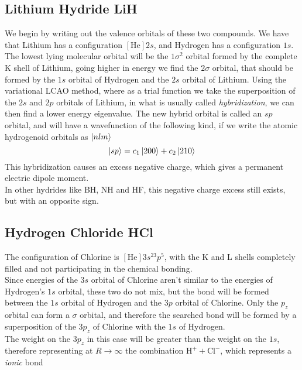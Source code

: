 \documentclass[../qm.tex]{subfiles}
\begin{document}
	\subsection{Lithium Hydride LiH}
	We begin by writing out the valence orbitals of these two compounds. We have that Lithium has a configuration $[\mathrm{He}]2s$, and Hydrogen has a configuration $1s$. The lowest lying molecular orbital will be the $1\sigma^2$ orbital formed by the complete K shell of Lithium, going higher in energy we find the $2\sigma$ orbital, that should be formed by the $1s$ orbital of Hydrogen and the $2s$ orbital of Lithium. Using the variational LCAO method, where as a trial function we take the superposition of the $2s$ and $2p$ orbitals of Lithium, in what is usually called \textit{hybridization}, we can then find a lower energy eigenvalue. The new hybrid orbital is called an $sp$ orbital, and will have a wavefunction of the following kind, if we write the atomic hydrogenoid orbitals as $\ket{nlm}$
	\begin{equation}
		\ket{sp}=c_1\ket{200}+c_2\ket{210}
		\label{eq:sporbital}
	\end{equation}
	This hybridization causes an excess negative charge, which gives a permanent electric dipole moment.\\
	In other hydrides like BH, NH and HF, this negative charge excess still exists, but with an opposite sign.
	\subsection{Hydrogen Chloride HCl}
	The configuration of Chlorine is $[\mathrm{He}]3s^23p^5$, with the K and L shells completely filled and not participating in the chemical bonding.\\
	Since energies of the $3s$ orbital of Chlorine aren't similar to the energies of Hydrogen's $1s$ orbital, these two do not mix, but the bond will be formed between the $1s$ orbital of Hydrogen and the $3p$ orbital of Chlorine. Only the $p_z$ orbital can form a $\sigma$ orbital, and therefore the searched bond will be formed by a superposition of the $3p_z$ of Chlorine with the $1s$ of Hydrogen.\\
	The weight on the $3p_z$ in this case will be greater than the weight on the $1s$, therefore representing at $R\to\infty$ the combination $\mathrm{H}^++\mathrm{Cl}^-$, which represents a \textit{ionic} bond
\end{document}
